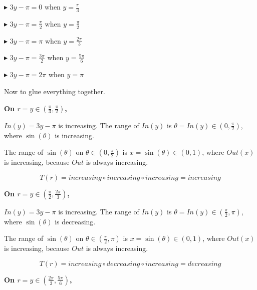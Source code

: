 \documentclass{ximera}
\begin{document}
$\blacktriangleright$ $3y - \pi = 0$ when $y = \frac{\pi}{3}$ 

$\blacktriangleright$ $3y - \pi = \frac{\pi}{2}$ when $y = \frac{\pi}{2}$ 

$\blacktriangleright$ $3y - \pi = \pi$ when $y = \frac{2\pi}{3}$ 

$\blacktriangleright$ $3y - \pi = \frac{3\pi}{2}$ when $y = \frac{5\pi}{6}$ 

$\blacktriangleright$ $3y - \pi = 2\pi$ when $y = \pi$ 





Now to glue everything together. 



\textbf{\textcolor{purple!80!black}{On $r = y \in \left( \frac{\pi}{3}, \frac{\pi}{2} \right)$, }}



$In(y) = 3y - \pi$ is increasing.  The range of $In(y)$ is $\theta = In(y) \in \left(0, \frac{\pi}{2} \right)$, where $\sin(\theta)$ is increasing. 



The range of $\sin(\theta)$ on $\theta \in \left(0, \frac{\pi}{2} \right)$ is $x = \sin(\theta) \in (0, 1)$, where $Out(x)$ is increasing, because $Out$ is always increasing. 


\[
T(r) = increasing \circ increasing \circ increasing = increasing
\]








\textbf{\textcolor{purple!80!black}{On $r = y \in \left( \frac{\pi}{2}, \frac{2\pi}{3} \right)$, }}




$In(y) = 3y - \pi$ is increasing.  The range of $In(y)$ is $\theta = In(y) \in \left(\frac{\pi}{2}, \pi \right)$, where $\sin(\theta)$ is decreasing. 



The range of $\sin(\theta)$ on $\theta \in \left( \frac{\pi}{2}, \pi \right)$ is $x = \sin(\theta) \in (0, 1)$, where $Out(x)$ is increasing, because $Out$ is always increasing. 


\[
T(r) = increasing \circ decreasing \circ increasing = decreasing
\]












\textbf{\textcolor{purple!80!black}{On $r = y \in \left( \frac{2\pi}{3}, \frac{5\pi}{6} \right)$, }}
\end{document}
